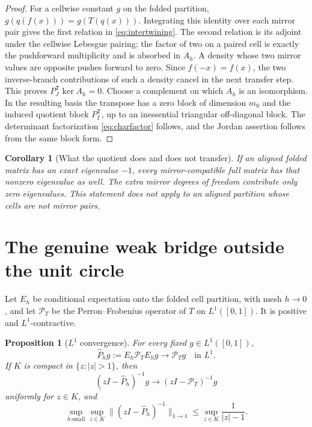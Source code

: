 \documentclass[11pt]{article}
\newtheorem{proposition}[theorem]{Proposition}
\newtheorem{corollary}[theorem]{Corollary}
\newcommand{\PT}{\mathcal P_T}
\begin{document}
\begin{proof}
For a cellwise constant $g$ on the folded partition,
$g(q(f(x)))=g(T(q(x)))$.  Integrating this identity over each mirror pair
gives the first relation in \eqref{eq:intertwining}.  The second relation is
its adjoint under the cellwise Lebesgue pairing; the factor of two on a
paired cell is exactly the pushforward multiplicity and is absorbed in
$A_h$.  A density whose two mirror values are opposite pushes forward to
zero.  Since $f(-x)=f(x)$, the two inverse-branch contributions of such a
density cancel in the next transfer step.  This proves
$P_J^{\mathsf T}\ker A_h=0$.  Choose a complement on which $A_h$ is an
isomorphism.  In the resulting basis the transpose has a zero block of
dimension $m_0$ and the induced quotient block $P_I^{\mathsf T}$, up to an
inessential triangular off-diagonal block.  The determinant factorization
\eqref{eq:charfactor} follows, and the Jordan assertion follows from the
same block form.
\end{proof}

\begin{corollary}[What the quotient does and does not transfer]
If an aligned folded matrix has an exact eigenvalue $-1$, every
mirror-compatible full matrix has that nonzero eigenvalue as well.  The extra
mirror degrees of freedom contribute only zero eigenvalues.  This statement
does not apply to an aligned partition whose cells are not mirror pairs.
\end{corollary}

\section{The genuine weak bridge outside the unit circle}

Let $E_h$ be conditional expectation onto the folded cell partition, with
mesh $h\to0$, and let $\PT$ be the Perron--Frobenius operator of $T$ on
$L^1([0,1])$.  It is positive and $L^1$-contractive.

\begin{proposition}[$L^1$ convergence]
\label{prop:l1}
For every fixed $g\in L^1([0,1])$,
\begin{equation}
 \widehat P_hg:=E_h\PT E_hg\longrightarrow\PT g
 \quad\text{in }L^1.
 \label{eq:l1bridge}
\end{equation}
If $K$ is compact in $\{z:|z|>1\}$, then
\begin{equation}
 (zI-\widehat P_h)^{-1}g\longrightarrow(zI-\PT)^{-1}g
 \label{eq:resbridge}
\end{equation}
uniformly for $z\in K$, and
\begin{equation}
 \sup_{h\,\text{small}}\sup_{z\in K}
 \|(zI-\widehat P_h)^{-1}\|_{1\to1}
 \leq \sup_{z\in K}\frac1{|z|-1}.
 \label{eq:resbound}
\end{equation}
\end{proposition}
\end{document}
